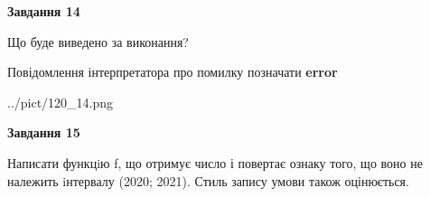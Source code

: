 \documentclass[11pt, ukrainian]{article}
\begin{document}
{\begin {large}
{\begin {center}\textbf{Завдання 14}\end {center}}\par
Що буде виведено за виконання? \par
Повідомлення інтерпретатора про помилку позначати \textbf{error}

\begin{center}
	{../pict/120_14.png}
\end{center}
\newpage

{\begin {center}\textbf{Завдання 15}\end {center}}\par

Написати функцiю f, що отримує число і повертає ознаку того, що воно не належить iнтервалу (2020; 2021). Стиль запису умови також оцінюється.\par
\newpage

\end {large}}
\end{document}
